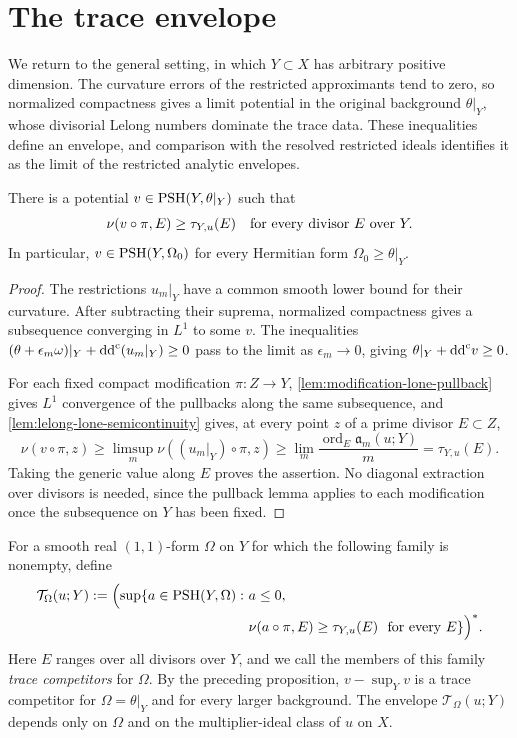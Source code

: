 \section{The trace envelope}\label{sec:trace-envelope}

We return to the general setting, in which $Y\subset X$ has arbitrary positive dimension. The curvature errors of the restricted approximants tend to zero, so normalized compactness gives a limit potential in the original background $\theta|_Y$, whose divisorial Lelong numbers dominate the trace data. These inequalities define an envelope, and comparison with the resolved restricted ideals identifies it as the limit of the restricted analytic envelopes.

\begin{proposition}\label{prop:trace-profile-majorant}
There is a potential $v\in\mathrm{PSH}(Y,\theta|_Y)$ such that
\[
 \nu(v\circ\pi,E)\geq\tau_{Y,u}(E)
 \quad\hbox{for every divisor }E\hbox{ over }Y.
\]
In particular, $v\in\mathrm{PSH}(Y,\Omega_0)$ for every Hermitian form $\Omega_0\geq\theta|_Y$.
\end{proposition}
\begin{proof}
The restrictions $u_m|_Y$ have a common smooth lower bound for their curvature. After subtracting their suprema, normalized compactness gives a subsequence converging in $L^1$ to some $v$. The inequalities $(\theta+\epsilon_m\omega)|_Y+\mathrm{dd}^{\mathrm{c}}(u_m|_Y)\geq0$ pass to the limit as $\epsilon_m\to0$, giving $\theta|_Y+\mathrm{dd}^{\mathrm{c}} v\geq0$.

For each fixed compact modification $\pi\colon Z\to Y$, \cref{lem:modification-lone-pullback} gives $L^1$ convergence of the pullbacks along the same subsequence, and \cref{lem:lelong-lone-semicontinuity} gives, at every point $z$ of a prime divisor $E\subset Z$,
\[
 \nu(v\circ\pi,z)
 \geq\limsup_m\nu((u_m|_Y)\circ\pi,z)
 \geq\lim_m\frac{\operatorname{ord}_E\mathfrak a_m(u;Y)}m
 =\tau_{Y,u}(E).
\]
Taking the generic value along $E$ proves the assertion. No diagonal extraction over divisors is needed, since the pullback lemma applies to each modification once the subsequence on $Y$ has been fixed.
\end{proof}

For a smooth real $(1,1)$-form $\Omega$ on $Y$ for which the following family is nonempty, define
\begin{equation}\label{eq:trace-profile-envelope}
 \begin{split}
 \mathcal T_\Omega(u;Y):=\Bigl(\sup\{a\in\mathrm{PSH}(Y,\Omega):\ &a\leq0,\\
 &\nu(a\circ\pi,E)\geq\tau_{Y,u}(E)\
 \text{ for every }E\}\Bigr)^*.
 \end{split}
\end{equation}
Here $E$ ranges over all divisors over $Y$, and we call the members of this family \emph{trace competitors} for $\Omega$. By the preceding proposition, $v-\sup_Yv$ is a trace competitor for $\Omega=\theta|_Y$ and for every larger background. The envelope $\mathcal T_\Omega(u;Y)$ depends only on $\Omega$ and on the multiplier-ideal class of $u$ on $X$.


